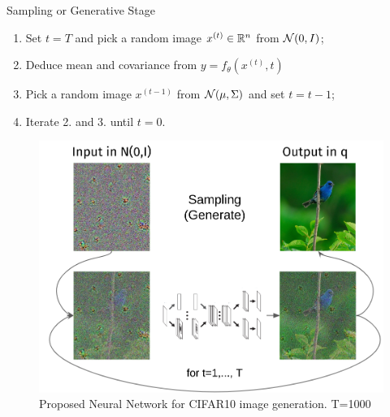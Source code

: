 \documentclass[aspectratio=169, 9pt]{beamer}
\theoremstyle{definition}
\begin{document}
\begin{frame}{Sampling or Generative Stage}
  \begin{minipage}[h]{0.5\textwidth}
    \begin{enumerate}
      \item Set $t=T$ and pick a random image $x^{(t)}\in\mathbb{R}^n$ from $\mathcal{N}(0,I)$;
      \item Deduce mean and covariance from $y=f_\theta(x^{(t)}, t)$
      \item Pick a random image $x^{(t-1)}$ from $\mathcal{N}(\mu,\Sigma)$ and set
        $t=t-1$;
      \item Iterate 2. and 3. until $t=0$.
    \end{enumerate}
  \end{minipage}\hfill
  \begin{minipage}[h]{0.5\textwidth}
  \begin{figure}[h!]
    \centering
    \includegraphics[width=1\textwidth]{./pic/sampling.png}
  \caption{Proposed Neural Network for CIFAR10 image generation. T=1000}
  \end{figure}
  \end{minipage}
\end{frame}
\end{document}
